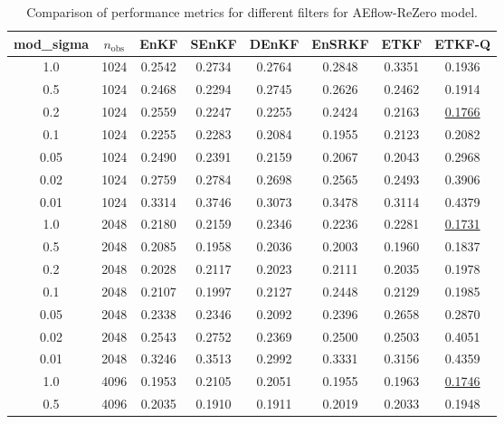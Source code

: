 \begin{table}[h]
	\centering
	\caption{Comparison of performance metrics for different filters for AEflow-ReZero model.}
	\label{tab:aeflow_comparison}
	\begin{tabular}{c c c c c c c c}
		\hline
		mod\_sigma & $n_{\textrm{obs}}$ & EnKF   & SEnKF  & DEnKF  & EnSRKF & ETKF   & ETKF-Q             \\
		\hline
		1.0        & 1024               & 0.2542 & 0.2734 & 0.2764 & 0.2848 & 0.3351 & 0.1936             \\
		0.5        & 1024               & 0.2468 & 0.2294 & 0.2745 & 0.2626 & 0.2462 & 0.1914             \\
		0.2        & 1024               & 0.2559 & 0.2247 & 0.2255 & 0.2424 & 0.2163 & \underline{0.1766} \\
		0.1        & 1024               & 0.2255 & 0.2283 & 0.2084 & 0.1955 & 0.2123 & 0.2082             \\
		0.05       & 1024               & 0.2490 & 0.2391 & 0.2159 & 0.2067 & 0.2043 & 0.2968             \\
		0.02       & 1024               & 0.2759 & 0.2784 & 0.2698 & 0.2565 & 0.2493 & 0.3906             \\
		0.01       & 1024               & 0.3314 & 0.3746 & 0.3073 & 0.3478 & 0.3114 & 0.4379             \\
		\hline
		1.0        & 2048               & 0.2180 & 0.2159 & 0.2346 & 0.2236 & 0.2281 & \underline{0.1731} \\
		0.5        & 2048               & 0.2085 & 0.1958 & 0.2036 & 0.2003 & 0.1960 & 0.1837             \\
		0.2        & 2048               & 0.2028 & 0.2117 & 0.2023 & 0.2111 & 0.2035 & 0.1978             \\
		0.1        & 2048               & 0.2107 & 0.1997 & 0.2127 & 0.2448 & 0.2129 & 0.1985             \\
		0.05       & 2048               & 0.2338 & 0.2346 & 0.2092 & 0.2396 & 0.2658 & 0.2870             \\
		0.02       & 2048               & 0.2543 & 0.2752 & 0.2369 & 0.2500 & 0.2503 & 0.4051             \\
		0.01       & 2048               & 0.3246 & 0.3513 & 0.2992 & 0.3331 & 0.3156 & 0.4359             \\
		\hline
		1.0        & 4096               & 0.1953 & 0.2105 & 0.2051 & 0.1955 & 0.1963 & \underline{0.1746} \\
		0.5        & 4096               & 0.2035 & 0.1910 & 0.1911 & 0.2019 & 0.2033 & 0.1948             \\

\end{tabular}
\end{table}
